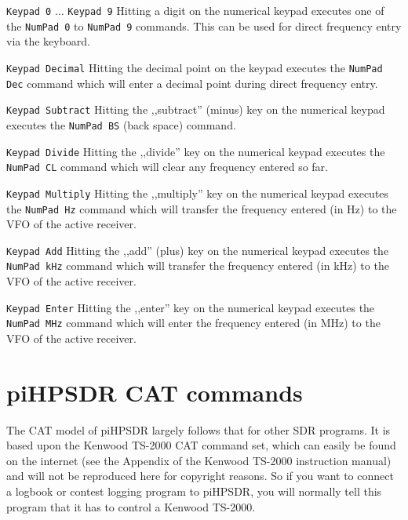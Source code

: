 \documentclass[12pt]{book}
\def\rett#1{\texttt{\color{red}#1}}
\def\bltt#1{\texttt{\color{blue}#1}}
\begin{document}
\rett{Keypad 0} $\ldots$ \rett{Keypad 9} Hitting a digit on the numerical keypad executes one of the
\bltt{NumPad 0} to \bltt{NumPad 9} commands. This can be used for direct frequency entry
via the keyboard.

\rett{Keypad Decimal} Hitting the decimal point on the keypad executes the \bltt{NumPad Dec}
command which will enter a decimal point during direct frequency entry.

\rett{Keypad Subtract} Hitting the ,,subtract'' (minus) key on the numerical keypad executes the
\bltt{NumPad BS} (back space) command.

\rett{Keypad Divide} Hitting the ,,divide'' key on the numerical keypad executes the \bltt{NumPad CL}
command which will clear any frequency entered so far.

\rett{Keypad Multiply} Hitting the ,,multiply'' key on the numerical keypad executes the \bltt{NumPad Hz}
command which will transfer the frequency entered (in Hz) to the VFO of the active receiver.

\rett{Keypad Add} Hitting the ,,add'' (plus) key on the numerical keypad executes the \bltt{NumPad kHz}
command which will transfer the frequency entered (in kHz) to the VFO of the active receiver.

\rett{Keypad Enter} Hitting the ,,enter'' key on the numerical keypad executes the \bltt{NumPad MHz}
command which will enter the frequency entered (in MHz) to the VFO of the active receiver.


\chapter{piHPSDR CAT commands}
\label{sec:catcommands}
The CAT model of piHPSDR largely follows that for other SDR programs. It is based upon the Kenwood TS-2000
CAT command
set, which can easily be found on the internet (see the Appendix of the Kenwood TS-2000 instruction manual)
and will not be reproduced here
for copyright reasons. So if you want to connect a logbook
or contest logging program to piHPSDR, you will normally tell this program that it has to control a Kenwood
TS-2000.
\end{document}

